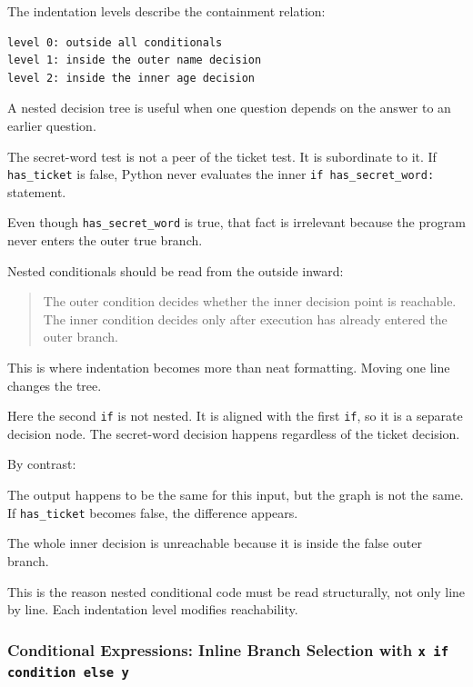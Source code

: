 The indentation levels describe the containment relation:

\begin{verbatim}
level 0: outside all conditionals
level 1: inside the outer name decision
level 2: inside the inner age decision
\end{verbatim}

A nested decision tree is useful when one question depends on the answer to an earlier question.

The secret-word test is not a peer of the ticket test. It is subordinate to it. If \texttt{has\_ticket} is false, Python never evaluates the inner \texttt{if has\_secret\_word:} statement.

Even though \texttt{has\_secret\_word} is true, that fact is irrelevant because the program never enters the outer true branch.

Nested conditionals should be read from the outside inward:

\begin{quote}
The outer condition decides whether the inner decision point is reachable. The inner condition decides only after execution has already entered the outer branch.
\end{quote}

This is where indentation becomes more than neat formatting. Moving one line changes the tree.

Here the second \texttt{if} is not nested. It is aligned with the first \texttt{if}, so it is a separate decision node. The secret-word decision happens regardless of the ticket decision.

By contrast:

The output happens to be the same for this input, but the graph is not the same. If \texttt{has\_ticket} becomes false, the difference appears.

The whole inner decision is unreachable because it is inside the false outer branch.

This is the reason nested conditional code must be read structurally, not only line by line. Each indentation level modifies reachability.

\subsubsection{Conditional Expressions: Inline Branch Selection with \texttt{x if condition else y}}

